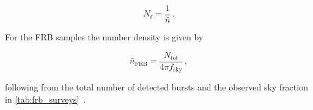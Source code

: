 \begin{equation}\label{eq:shot_noise}
    N_{\ell} = \frac{1}{\bar{n}} \,.
\end{equation}

For the FRB samples the number density is given by 

\begin{equation}
    \bar{n}_{\mathrm{FRB}} = \frac{N_{\mathrm{tot}}}{4\pi f_{\mathrm{sky}}} \,,
\end{equation}

following from the total number of detected bursts and the
observed sky fraction in \autoref{tab:frb_surveys}~\cite{Reischke_2021}. 
